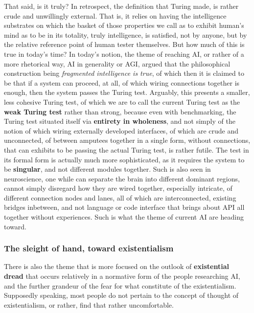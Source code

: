 That said, is it truly? In retrospect, the definition that Turing made, is rather crude and unwillingly external. That is, it relies on having the intelligence substrates on which the basket of those properties we call as to exhibit human's mind as to be in its totality, truly intelligence, is satisfied, not by anyone, but by the relative reference point of human tester themselves. But how much of this is true in today's time? In today's notion, the theme of reaching AI, or rather of a more rhetorical way, AI in generality or AGI, argued that the philosophical construction being \textit{fragmented intelligence is true}, of which then it is claimed to be that if a system can proceed, at all, of which wiring connections together is enough, then the system passes the Turing test. Arguably, this presents a smaller, less cohesive Turing test, of which we are to call the current Turing test as the \textbf{weak Turing test} rather than strong, because even with benchmarking, the Turing test situated itself via \textbf{entirety in wholeness}, and not simply of the notion of which wiring externally developed interfaces, of which are crude and unconnected, of between amputees together in a single form, without connections, that can exhibits to be passing the actual Turing test, is rather futile. The test in its formal form is actually much more sophisticated, as it requires the system to be \textbf{singular}, and not different modules together. Such is also seen in neuroscience, one while can separate the brain into different dominant regions, cannot simply disregard how they are wired together, especially intricate, of different connection nodes and lanes, all of which are interconnected, existing bridges inbetween, and not language or code interface that brings about API all together without experiences. Such is what the theme of current AI are heading toward. 

\subsubsection{The sleight of hand, toward existentialism}

There is also the theme that is more focused on the outlook of \textbf{existential dread} that occurs relatively in a normative form of the people researching AI, and the further grandeur of the fear for what constitute of the existentialism. Supposedly speaking, most people do not pertain to the concept of thought of existentialism, or rather, find that rather uncomfortable. 

